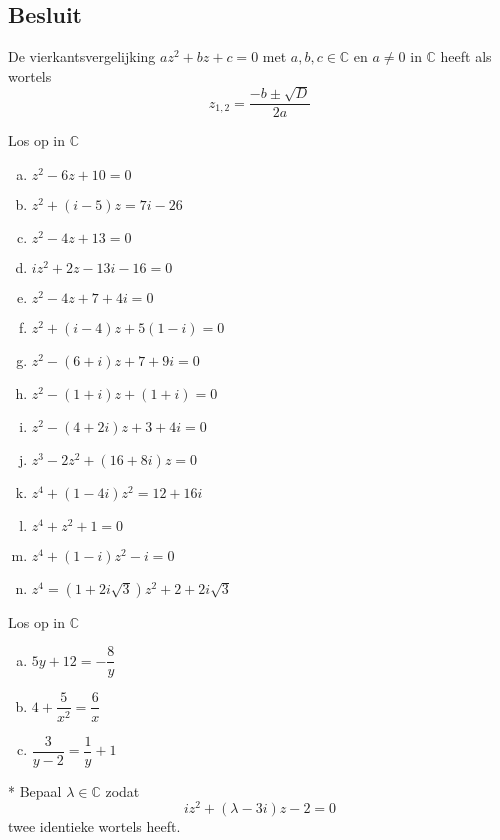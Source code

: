 \documentclass[12pt,twoside,a4]{article}
\begin{document}
\subsection{Besluit}

\begin{mdframed}
De vierkantsvergelijking $az^2+bz+c=0$ met $a,b,c\in\mathbb{C}$ en $a\neq 0$ in $\mathbb{C}$ heeft als wortels
$$ z_{1,2}=\dfrac{-b\pm\sqrt{D}}{2a}$$
\end{mdframed}

\begin{oefening}
  Los op in $\mathbb{C}$
  \begin{multicols}{2}
    \begin{enumerate}[(a)]
      \itemsep 1em
    \item $z^2-6z+10=0$
    \item $z^2+(i-5)z=7i-26$
    \item $z^2-4z+13=0$
    \item $iz^2+2z-13i-16=0$
    \item $z^2-4z+7+4i=0$
    \item $z^2+(i-4)z+5(1-i)=0$
    \item $z^2-(6+i)z+7+9i=0$
    \item $z^2-(1+i)z+(1+i)=0$
    \item $z^2-(4+2i)z+3+4i=0$
    \item $z^3-2z^2+(16+8i)z=0$
    \item $z^4+(1-4i)z^2=12+16i$
    \item $z^4+z^2+1=0$
    \item $z^4+(1-i)z^2-i=0$
    \item $z^4=(1+2i\sqrt{3})z^2+2+2i\sqrt{3}$
    \end{enumerate}
  \end{multicols}
\end{oefening}

\begin{oefening}
Los op in $\mathbb{C}$
  \begin{enumerate}[(a)]
    \itemsep 1em
  \item $5y+12=-\dfrac{8}{y}$
  \item $4+\dfrac{5}{x^2}=\dfrac{6}{x}$
  \item $\dfrac{3}{y-2}=\dfrac{1}{y}+1$
  \end{enumerate}
\end{oefening}

\pagebreak
\begin{oefening}*
  Bepaal $\lambda\in\mathbb{C}$ zodat
  \[iz^2+(\lambda-3i)z-2=0\]
  twee identieke wortels heeft.
\end{oefening}
\end{document}
